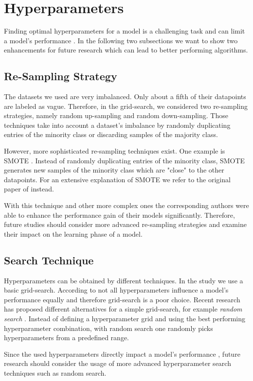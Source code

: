 \section{Hyperparameters}
\label{chp:future_work:sec:hyperparameters}
Finding optimal hyperparameters for a model is a challenging task and can limit a model's performance \parencite{Bergstra:2011,Zeiler:2012}.
In the following two subsections we want to show two enhancements for future research which can lead to better performing algorithms.

\subsection{Re-Sampling Strategy}
\label{chp:future_work:sec:hyperparameters:re_sampling_strategy}
The datasets we used are very imbalanced.
Only about a fifth of their datapoints are labeled as vague.
Therefore, in the grid-search, we considered two re-sampling strategies, namely random up-sampling and random down-sampling.
Those techniques take into account a dataset's imbalance by randomly duplicating entries of the minority class or discarding samples of the majority class.

However, more sophisticated re-sampling techniques exist.
One example is \ac{SMOTE} \parencite{Chawla:2002}.
Instead of randomly duplicating entries of the minority class, \ac{SMOTE} generates new samples of the minority class which are "close" to the other datapoints.
For an extensive explanation of \ac{SMOTE} we refer to the original paper of \textcite{Chawla:2002} instead.

With this technique and other more complex ones \parencite{Li:2008} the corresponding authors were able to enhance the performance gain of their models significantly.
Therefore, future studies should consider more advanced re-sampling strategies and examine their impact on the learning phase of a model.

\subsection{Search Technique}
\label{chp:future_work:sec:hyperparameters:search_technique}
Hyperparameters can be obtained by different techniques.
In the study we use a basic grid-search.
According to \textcite{Bergstra:2012} not all hyperparameters influence a model's performance equally and therefore grid-search is a poor choice.
Recent research has proposed different alternatives for a simple grid-search, for example \textit{random search} \parencite{Bergstra:2012}.
Instead of defining a hyperparameter grid and using the best performing hyperparameter combination, with random search one randomly picks hyperparameters from a predefined range.

Since the used hyperparameters directly impact a model's performance \parencite{Claesen:2015}, future research should consider the usage of more advanced hyperparameter search techniques such as random search.
